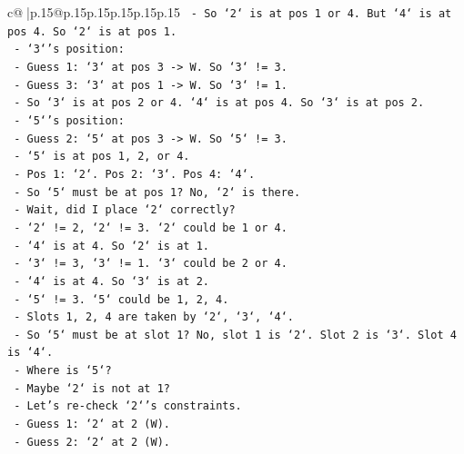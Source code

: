 \documentclass{article}
\begin{document}
{\begin{supertabular}{c@{$\;$}|p{.15\linewidth}@{}p{.15\linewidth}p{.15\linewidth}p{.15\linewidth}p{.15\linewidth}p{.15\linewidth}}
{{{\texttt{                        {-} So `2` is at pos 1 or 4. But `4` is at pos 4. So `2` is at pos 1.} \\
\texttt{                        {-} `3`'s position:} \\
\texttt{                        {-} Guess 1: `3` at pos 3 {-}> W. So `3` != 3.} \\
\texttt{                        {-} Guess 3: `3` at pos 1 {-}> W. So `3` != 1.} \\
\texttt{                        {-} So `3` is at pos 2 or 4. `4` is at pos 4. So `3` is at pos 2.} \\
\texttt{                        {-} `5`'s position:} \\
\texttt{                        {-} Guess 2: `5` at pos 3 {-}> W. So `5` != 3.} \\
\texttt{                        {-} `5` is at pos 1, 2, or 4.} \\
\texttt{                        {-} Pos 1: `2`. Pos 2: `3`. Pos 4: `4`.} \\
\texttt{                        {-} So `5` must be at pos 1? No, `2` is there.} \\
\texttt{                        {-} Wait, did I place `2` correctly?} \\
\texttt{                        {-} `2` != 2, `2` != 3. `2` could be 1 or 4.} \\
\texttt{                        {-} `4` is at 4. So `2` is at 1.} \\
\texttt{                        {-} `3` != 3, `3` != 1. `3` could be 2 or 4.} \\
\texttt{                        {-} `4` is at 4. So `3` is at 2.} \\
\texttt{                        {-} `5` != 3. `5` could be 1, 2, 4.} \\
\texttt{                        {-} Slots 1, 2, 4 are taken by `2`, `3`, `4`.} \\
\texttt{                        {-} So `5` must be at slot 1? No, slot 1 is `2`. Slot 2 is `3`. Slot 4 is `4`.} \\
\texttt{                        {-} Where is `5`?} \\
\texttt{                        {-} Maybe `2` is not at 1?} \\
\texttt{                        {-} Let's re{-}check `2`'s constraints.} \\
\texttt{                        {-} Guess 1: `2` at 2 (W).} \\
\texttt{                        {-} Guess 2: `2` at 2 (W).} \\
}}}
\end{supertabular}}
\end{document}
